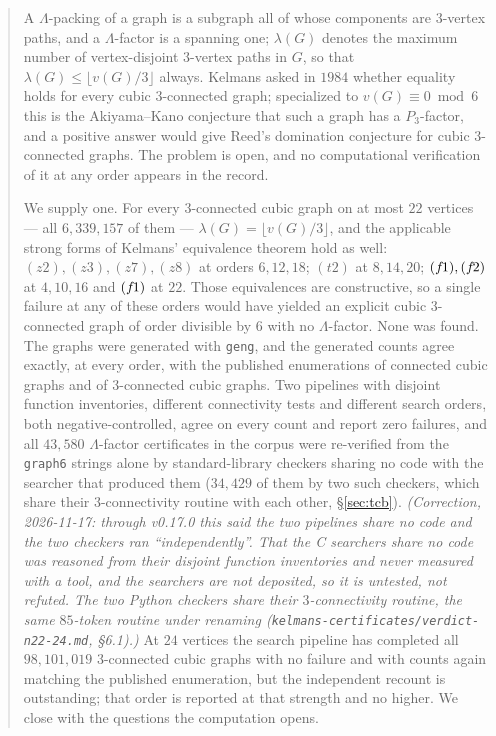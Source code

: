\documentclass[11pt]{amsart}
\newcommand{\vv}{v}
\theoremstyle{plain}
\theoremstyle{definition}
\theoremstyle{remark}
\begin{document}
\begin{abstract}
A $\Lambda$-packing of a graph is a subgraph all of whose components are
$3$-vertex paths, and a $\Lambda$-factor is a spanning one; $\lambda(G)$
denotes the maximum number of vertex-disjoint $3$-vertex paths in $G$, so
that $\lambda(G)\le\lfloor \vv(G)/3\rfloor$ always. Kelmans asked in
$1984$ whether equality holds for every cubic $3$-connected graph;
specialized to $\vv(G)\equiv 0 \bmod 6$ this is the Akiyama--Kano
conjecture that such a graph has a $P_3$-factor, and a positive answer
would give Reed's domination conjecture for cubic $3$-connected graphs.
The problem is open, and no computational verification of it at any order
appears in the record.

We supply one. For every $3$-connected cubic graph on at most $22$
vertices --- all $6{,}339{,}157$ of them --- $\lambda(G)=\lfloor
\vv(G)/3\rfloor$, and the applicable strong forms of Kelmans' equivalence
theorem hold as well: $(z2),(z3),(z7),(z8)$ at orders $6,12,18$; $(t2)$ at
$8,14,20$; $(f\mkern-2mu1),(f\mkern-2mu2)$ at $4,10,16$ and $(f\mkern-2mu1)$ at $22$. Those equivalences
are constructive, so a single failure at any of these orders would have
yielded an explicit cubic $3$-connected graph of order divisible by $6$
with no $\Lambda$-factor. None was found. The graphs were generated with
\texttt{geng}, and the generated counts agree exactly, at every order,
with the published enumerations of connected cubic graphs and of
$3$-connected cubic graphs. Two pipelines with disjoint function
inventories, different connectivity tests and different search orders,
both negative-controlled, agree on every count and report zero failures,
and all $43{,}580$
$\Lambda$-factor certificates in the corpus were re-verified from the
\texttt{graph6} strings alone by standard-library checkers sharing no code
with the searcher that produced them ($34{,}429$ of them by two such
checkers, which share their $3$-connectivity routine with each other,
\S\ref{sec:tcb}). \emph{(Correction, 2026-11-17: through v0.17.0 this said
the two pipelines share no code and the two checkers ran
``independently''. That the C searchers share no code was reasoned from
their disjoint function inventories and never measured with a tool, and
the searchers are not deposited, so it is untested, not refuted. The two
Python checkers share their $3$-connectivity routine, the same $85$-token
routine under renaming (\texttt{kelmans-certificates/verdict-n22-24.md},
\S6.1).)} At $24$ vertices the search pipeline has
completed all $98{,}101{,}019$ $3$-connected cubic graphs with no failure
and with counts again matching the published enumeration, but the
independent recount is outstanding; that order is reported at that
strength and no higher. We close with the questions the computation
opens.
\end{abstract}
\end{document}
